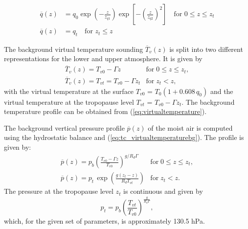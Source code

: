 \documentclass[times,doublespace]{fldauth}
\begin{document}
\begin{equation}
\begin{split}
\overline{q}(z)&=q_0 \exp\left(- \frac{z}{z_{q1}}\right)\exp\left[-\left(\frac{z}{z_{q2}}\right)^2\right] \text{ ~~for   } 0 \leq z \leq z_t \\
\overline{q}(z)&=q_t  \text{ ~~for   }  z_t \leq z
\end{split}
\end{equation}

The background virtual temperature sounding $\overline{T}_v(z)$ is split into two different representations for the lower and upper atmosphere.  It is given by
\begin{equation}
\begin{array}{ll} \label{eq:tc_virtualtemperaturebg}
\overline{T}_v(z) = T_{v0} - \Gamma z & \mbox{for} \; 0 \le z \le z_t, \\
\overline{T}_v(z) = T_{vt} = T_{v0} - \Gamma z_t & \mbox{for} \; z_t < z, 
\end{array}
\end{equation} with the virtual temperature at the surface $T_{v0}$ = $T_0 (1+0.608 \, q_0)$ and the virtual temperature at the tropopause level $T_{vt}$ = $T_{v0} - \Gamma z_t$.  The background temperature profile can be obtained from (\ref{eq:virtualtemperature}).

The background vertical pressure profile $\overline{p}(z)$ of the moist air is computed using the hydrostatic balance and (\ref{eq:tc_virtualtemperaturebg}). The profile is given by:
\begin{equation}
\begin{array}{ll}\label{eq4}
\displaystyle \overline{p}(z) = p_b \left( \frac{T_{v0} - \Gamma z}{T_{v0}} \right )^{g / R_d \Gamma} & \mbox{for} \; 0 \le z \le z_t, \\
\displaystyle \overline{p}(z) = p_t \, \exp{\left(\frac{g (z_t - z)}{R_d T_{vt}} \right)} & \mbox{for} \; z_t < z.
\end{array}
\end{equation}  The pressure at the tropopause level $z_t$ is continuous and given by 
\begin{equation}\label{eq4.5}
p_t = p_b \left( \frac{T_{vt}}{T_{v0}} \right )^{\frac{g}{R_d \Gamma}},
\end{equation}
which, for the given set of parameters, is approximately 130.5 hPa. 
\end{document}
